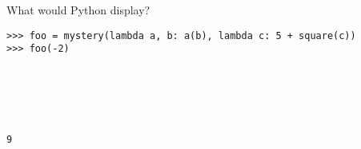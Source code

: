 \begin{blocksection}
\question What would Python display?

\begin{lstlisting}
>>> foo = mystery(lambda a, b: a(b), lambda c: 5 + square(c))
>>> foo(-2)






\end{lstlisting}

\begin{solution}
\begin{lstlisting}
9
\end{lstlisting}
\end{solution}
\end{blocksection}
